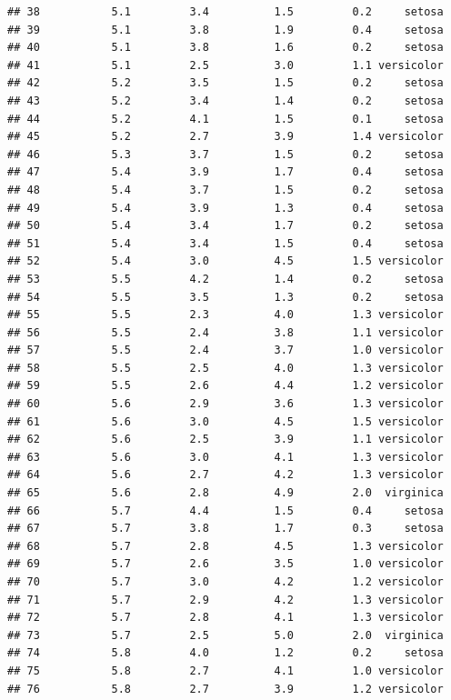 \documentclass[
]{article}
\begin{document}
\begin{verbatim}
## 38           5.1         3.4          1.5         0.2     setosa
## 39           5.1         3.8          1.9         0.4     setosa
## 40           5.1         3.8          1.6         0.2     setosa
## 41           5.1         2.5          3.0         1.1 versicolor
## 42           5.2         3.5          1.5         0.2     setosa
## 43           5.2         3.4          1.4         0.2     setosa
## 44           5.2         4.1          1.5         0.1     setosa
## 45           5.2         2.7          3.9         1.4 versicolor
## 46           5.3         3.7          1.5         0.2     setosa
## 47           5.4         3.9          1.7         0.4     setosa
## 48           5.4         3.7          1.5         0.2     setosa
## 49           5.4         3.9          1.3         0.4     setosa
## 50           5.4         3.4          1.7         0.2     setosa
## 51           5.4         3.4          1.5         0.4     setosa
## 52           5.4         3.0          4.5         1.5 versicolor
## 53           5.5         4.2          1.4         0.2     setosa
## 54           5.5         3.5          1.3         0.2     setosa
## 55           5.5         2.3          4.0         1.3 versicolor
## 56           5.5         2.4          3.8         1.1 versicolor
## 57           5.5         2.4          3.7         1.0 versicolor
## 58           5.5         2.5          4.0         1.3 versicolor
## 59           5.5         2.6          4.4         1.2 versicolor
## 60           5.6         2.9          3.6         1.3 versicolor
## 61           5.6         3.0          4.5         1.5 versicolor
## 62           5.6         2.5          3.9         1.1 versicolor
## 63           5.6         3.0          4.1         1.3 versicolor
## 64           5.6         2.7          4.2         1.3 versicolor
## 65           5.6         2.8          4.9         2.0  virginica
## 66           5.7         4.4          1.5         0.4     setosa
## 67           5.7         3.8          1.7         0.3     setosa
## 68           5.7         2.8          4.5         1.3 versicolor
## 69           5.7         2.6          3.5         1.0 versicolor
## 70           5.7         3.0          4.2         1.2 versicolor
## 71           5.7         2.9          4.2         1.3 versicolor
## 72           5.7         2.8          4.1         1.3 versicolor
## 73           5.7         2.5          5.0         2.0  virginica
## 74           5.8         4.0          1.2         0.2     setosa
## 75           5.8         2.7          4.1         1.0 versicolor
## 76           5.8         2.7          3.9         1.2 versicolor

\end{verbatim}
\end{document}
